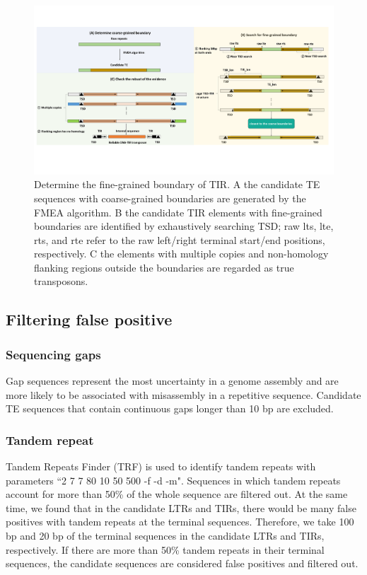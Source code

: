 \documentclass{bmcart}
\begin{document}
\begin{figure}[h!]
	\centerline{\includegraphics[width=1.0\textwidth]{figures/FineGrainedTE.pdf}}
	\caption{Determine the fine-grained boundary of TIR. A the candidate TE sequences with coarse-grained boundaries are generated by the FMEA algorithm. B the candidate TIR elements with fine-grained boundaries are identified by exhaustively searching TSD; raw lts, lte, rts, and rte refer to the raw left/right terminal start/end positions, respectively. C the elements with multiple copies and non-homology flanking regions outside the boundaries are regarded as true transposons.}
	\label{fig:fine_grained_TE}
\end{figure}

\subsection*{Filtering false positive}
\subsubsection*{Sequencing gaps}
Gap sequences represent the most uncertainty in a genome assembly and are more likely to be associated with misassembly in a repetitive sequence\cite{ou2019benchmarking}. Candidate TE sequences that contain continuous gaps longer than 10 bp are excluded.

\subsubsection*{Tandem repeat}
Tandem Repeats Finder (TRF)\cite{benson1999tandem} is used to identify tandem repeats with parameters ``2 7 7 80 10 50 500 -f -d -m". Sequences in which tandem repeats account for more than 50\% of the whole sequence are filtered out. At the same time, we found that in the candidate LTRs and TIRs, there would be many false positives with tandem repeats at the terminal sequences. Therefore, we take 100 bp and 20 bp of the terminal sequences in the candidate LTRs and TIRs, respectively. If there are more than 50\% tandem repeats in their terminal sequences, the candidate sequences are considered false positives and filtered out.
\end{document}
